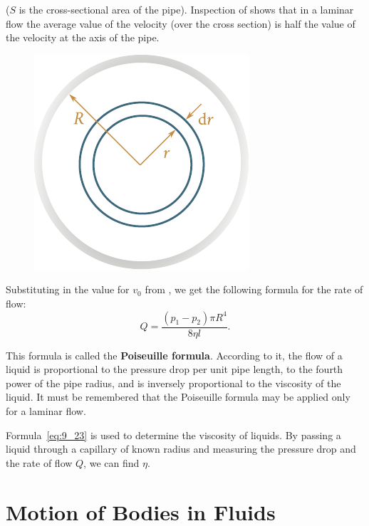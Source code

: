 \noindent
($S$ is the cross-sectional area of the pipe). Inspection of  shows that in a laminar flow the average value of the velocity (over the cross section) is half the value of the velocity at the axis of the pipe.

\begin{figure}[t]
	\begin{center}
		\includegraphics[scale=0.95]{figures/ch_09/fig_9_13.pdf}
		\caption[]{}
		\label{fig:9_13}
	\end{center}
	\vspace{-0.8cm}
\end{figure}

Substituting in  the value for $v_0$ from , we get the following formula for the rate of flow:
\begin{equation}\label{eq:9_23}
	Q = \frac{(p_1 - p_2)\pi R^4}{8\eta l}.
\end{equation}

\noindent
This formula is called the \textbf{Poiseuille formula}. According to it, the flow of a liquid is proportional to the pressure drop per unit pipe length, to the fourth power of the pipe radius, and is inversely proportional to the viscosity of the liquid. It must be remembered that the Poiseuille formula may be applied only for a laminar flow.

Formula~\eqref{eq:9_23} is used to determine the viscosity of liquids. By passing a liquid through a capillary of known radius and measuring the pressure drop and the rate of flow $Q$, we can find $\eta$.

\section{Motion of Bodies in Fluids}\label{sec:9_7}

